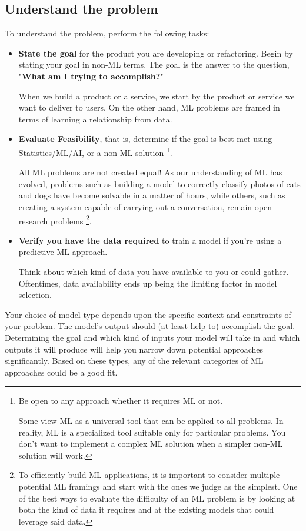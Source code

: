 \subsection*{Understand the problem}
To understand the problem, perform the following tasks:
\begin{itemize}
    \item \textbf{State the goal} for the product you are developing
    or refactoring. Begin by stating your goal in non-ML terms.
    The goal is the answer to the question,
    "\textbf{What am I trying to accomplish?}"

    When we build a product or a service, we start by the product or
    service we want to deliver to users. On the other hand, ML
    problems are framed in terms of learning a relationship from data.


    \item \textbf{Evaluate Feasibility}, that is, determine if the
    goal is best met using Statistics/ML/AI, or a non-ML solution
    \footnote{
        Be open to any approach whether it requires ML or not.

        Some view ML as a universal tool that can be applied to
        all problems. In reality, ML is a specialized tool
        suitable only for particular problems. You don't want
        to implement a complex ML solution when a simpler non-ML
        solution will work.
    }.
    
    All ML problems are not created equal! As our understanding of ML
    has evolved, problems such as building a model to correctly
    classify photos of cats and dogs have become solvable in a matter
    of hours, while others, such as creating a system capable of
    carrying out a conversation, remain open research  problems
    \footnote{
        To efficiently build ML applications, it is
        important to consider multiple potential ML
        framings and start with the ones we judge as
        the simplest. One of the best ways to evaluate
        the difficulty of an ML problem is by looking at
        both the kind of data it requires and at the
        existing models that could leverage said data.
    }.


    \item \textbf{Verify you have the data required} to train a model
    if you're using a predictive ML approach.

    Think about which kind of data you have available to you or could
    gather. Oftentimes, data availability ends up being the limiting
    factor in model selection.
\end{itemize}
Your choice of model type depends upon the specific context and
constraints of your problem. The model's output should
(at least help to) accomplish the goal.  Determining the goal
and which kind of inputs your model will take in and which outputs
it will produce will help you narrow down potential approaches
significantly. Based on these types, any of the relevant categories
of ML approaches could be a good fit. 



